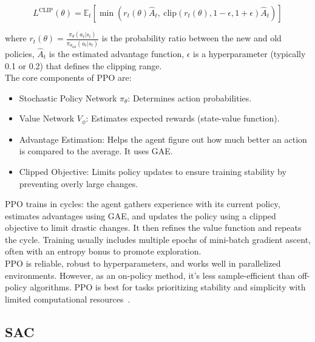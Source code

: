 {\footnotesize
\begin{equation}
L^{\text{CLIP}}(\theta) = \mathbb{E}_t\left[\min\left(r_t(\theta)\hat{A}_t,\ \text{clip}(r_t(\theta), 1 - \epsilon, 1 + \epsilon)\hat{A}_t\right)\right]
\end{equation}
}

\noindent where \(r_t(\theta) = \frac{\pi_\theta(a_t|s_t)}{\pi_{\theta_{\text{old}}}(a_t|s_t)}\) is the probability ratio between the new and old policies, \(\hat{A}_t\) is the estimated advantage function, \(\epsilon\) is a hyperparameter (typically 0.1 or 0.2) that defines the clipping range.\\

\noindent The core components of \gls{PPO} are:
\begin{itemize}
    \item Stochastic Policy Network \(\pi_\theta\): Determines action probabilities.
    
    \item Value Network \(V_\phi\): Estimates expected rewards (state-value function).
    
    \item Advantage Estimation: Helps the agent figure out how much better an action is compared to the average. It uses \gls{GAE}.
    
    \item Clipped Objective: Limits policy updates to ensure training stability by preventing overly large changes.
\end{itemize}

\noindent \gls{PPO} trains in cycles: the agent gathers experience with its current policy, estimates advantages using \gls{GAE}, and updates the policy using a clipped objective to limit drastic changes. It then refines the value function and repeats the cycle. Training usually includes multiple epochs of mini-batch gradient ascent, often with an entropy bonus to promote exploration.\\

\noindent \gls{PPO} is reliable, robust to hyperparameters, and works well in parallelized environments. However, as an on-policy method, it's less sample-efficient than off-policy algorithms. \gls{PPO} is best for tasks prioritizing stability and simplicity with limited computational resources~\cite{schulman2017proximalpolicyoptimizationalgorithms, schulman2015gae}.

\subsection{\gls{SAC}}

